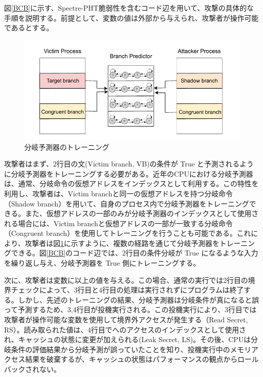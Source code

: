 図\ref{BCB}に示す、Spectre-PHT脆弱性を含むコード辺を用いて、攻撃の具体的な手順を説明する。前提として、変数の値は外部から与えられ、攻撃者が操作可能であるとする。\par

\begin{figure}[tb]
  \centering
  \includegraphics[width=\linewidth]{img/branch_predicator.drawio.pdf}
  \caption{分岐予測器のトレーニング}
  \label{fig:branch_predicator}
\end{figure}


攻撃者はまず、2行目の文(Victim branch, VB)の条件が True と予測されるように分岐予測器をトレーニングする必要がある。近年のCPUにおける分岐予測器は、通常、分岐命令の仮想アドレスをインデックスとして利用する\cite{fog2016microarchitecture,8835233}。この特性を利用し、攻撃者は、Victim branchと同一の仮想アドレスを持つ分岐命令（Shadow branch）を用いて、自身のプロセス内で分岐予測器をトレーニングできる。また、仮想アドレスの一部のみが分岐予測器のインデックスとして使用される場合には、Victim branchと仮想アドレスの一部が一致する分岐命令（Congruent branch）を使用してトレーニングを行うことも可能である。これにより、攻撃者は図\ref{fig:branch_predicator}に示すように、複数の経路を通じて分岐予測器をトレーニングできる\cite{canella2019systematic}。図\ref{BCB}のコード辺では、2行目の条件分岐が True になるような入力を繰り返し与え、分岐予測器を True 側にトレーニングする。\par

次に、攻撃者は変数に以上の値を与える。この場合、通常の実行では2行目の境界チェックによって、3行目と4行目の処理は実行されずにプログラムは終了する。しかし、先述のトレーニングの結果、分岐予測器は分岐条件が真になると誤って予測するため、3,4行目が投機実行される。この投機実行により、3行目では攻撃者が操作可能な変数を使用して境界外アクセスが発生する（Read Secret, RS）。読み取られた値は、4行目でへのアクセスのインデックスとして使用され、キャッシュの状態に変更が加えられる(Leak Secret, LS)。その後、CPUは分岐条件の評価結果から分岐予測が誤っていたことを知り、投機実行中のメモリアクセス結果を破棄するが、キャッシュの状態はパフォーマンスの観点からロールバックされない。\par

